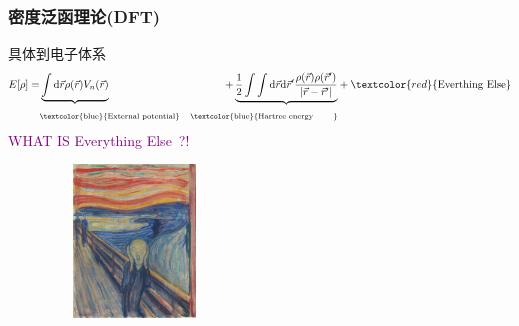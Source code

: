\frame
{
	\frametitle{密度泛函理论\textrm{(DFT)}}
	具体到电子体系
	\begin{displaymath}
		\begin{aligned}
			E[\rho]=&\underbrace{\int\mathrm{d}\vec r\rho(\vec r)V_n(\vec r)}&+\underbrace{\dfrac12\int\int\mathrm{d}\vec r\mathrm{d}\vec r^{\prime}\dfrac{\rho(\vec r)\rho(\vec r^{\prime})}{|\vec r-\vec r^{\prime}|}}&+\textcolor{red}{\mathrm{Everthing~Else}}\\
			&\mbox{\fontsize{7.0pt}{4.5pt}\selectfont{\textcolor{blue}{\textrm{External~potential}}}} &\mbox{\fontsize{7.0pt}{4.5pt}\selectfont{\textcolor{blue}{\textrm{Hartree~energy ~~~~~~}}}} &
		\end{aligned}
	\end{displaymath}
	\textcolor{purple}{\textrm{WHAT IS Everything Else~?!}}
\begin{figure}[h!]
\vskip -8pt
\centering
\includegraphics[height=1.60in,width=1.8in,viewport=0 0 212 275,clip]{Figures/Edvard_Munch-The-Scream.jpg}
\caption{\fontsize{6.0pt}{4.5pt}}%
\label{Edvard_Munch-The-Scream}
\end{figure}
}

